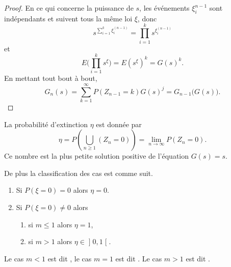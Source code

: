 \begin{proof}
	En ce qui concerne la puissance de \( s\), les événements \( \xi_i^{n-1}\) sont indépendants et suivent tous la même loi \( \xi\), donc
	\begin{equation}
		s^{\sum_{i=1}^{k}\xi_i^{(n-1)}}=\prod_{i=1}^ks^{\xi_i^{(n-1)}}
	\end{equation}
	et
	\begin{equation}
		E\big( \prod_{i=1}^ks^{\xi} \big)=E(s^{\xi})^k=G(s)^k.
	\end{equation}
	En mettant tout bout à bout,
	\begin{equation}
		G_n(s)=\sum_{k=1}^{\infty}P(Z_{n-1}=k)G(s)^j=G_{n-1}\big( G(s) \big).
	\end{equation}
\end{proof}

\begin{theorem}  \label{ThoJZnAOA}
	La probabilité d'extinction \( \eta\) est donnée par
	\begin{equation}
		\eta=P\left(\bigcup_{n\geq 1}(Z_n=0)\right)=\lim_{n\to \infty} P(Z_n=0).
	\end{equation}
	Ce nombre est la plus petite solution positive de l'équation \( G(s)=s\).

	De plus la classification des cas est comme suit.
	\begin{enumerate}
		\item
		      Si \( P(\xi=0)=0\) alors \( \eta=0\).
		\item
		      Si \( P(\xi=0)\neq 0\) alors
		      \begin{enumerate}
			      \item
			            si \( m\leq 1\) alors \( \eta=1\),
			      \item
			            si \( m>1\) alors \( \eta\in\mathopen] 0 , 1 \mathclose[\).
		      \end{enumerate}
	\end{enumerate}
\end{theorem}
Le cas \( m<1\) est dit , le cas \( m=1\) est dit . Le cas \( m>1\) est dit .

